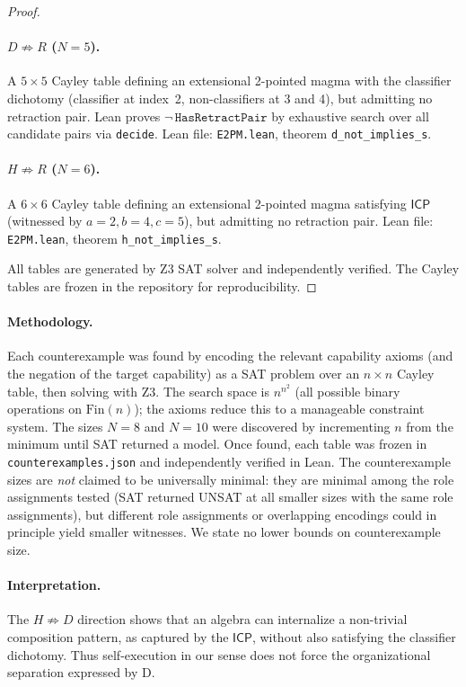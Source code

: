 \documentclass[sigconf,screen,review,anonymous]{acmart}
\newcommand{\ICP}{\textsf{ICP}}
\newcommand{\Fin}{\mathrm{Fin}}
\theoremstyle{remark}
\begin{document}
\begin{proof}
\paragraph{$D \not\Rightarrow R$ ($N\!=\!5$).}
A $5 \times 5$ Cayley table defining an extensional 2-pointed magma with the classifier dichotomy (classifier at index~2, non-classifiers at 3 and 4), but admitting no retraction pair. Lean proves $\neg\,\texttt{HasRetractPair}$ by exhaustive search over all candidate pairs via \texttt{decide}. Lean file: \texttt{E2PM.lean}, theorem \texttt{d\_not\_implies\_s}.

\paragraph{$H \not\Rightarrow R$ ($N\!=\!6$).}
A $6 \times 6$ Cayley table defining an extensional 2-pointed magma satisfying $\ICP$ (witnessed by $a\!=\!2, b\!=\!4, c\!=\!5$), but admitting no retraction pair. Lean file: \texttt{E2PM.lean}, theorem \texttt{h\_not\_implies\_s}.

All tables are generated by Z3 SAT solver and independently verified. The Cayley tables are frozen in the repository for reproducibility.
\end{proof}

\paragraph{Methodology.}
Each counterexample was found by encoding the relevant capability axioms (and the negation of the target capability) as a SAT problem over an $n \times n$ Cayley table, then solving with Z3. The search space is $n^{n^2}$ (all possible binary operations on $\Fin(n)$); the axioms reduce this to a manageable constraint system. The sizes $N\!=\!8$ and $N\!=\!10$ were discovered by incrementing $n$ from the minimum until SAT returned a model. Once found, each table was frozen in \texttt{counterexamples.json} and independently verified in Lean. The counterexample sizes are \emph{not} claimed to be universally minimal: they are minimal among the role assignments tested (SAT returned UNSAT at all smaller sizes with the same role assignments), but different role assignments or overlapping encodings could in principle yield smaller witnesses. We state no lower bounds on counterexample size.

\paragraph{Interpretation.}
The $H \not\Rightarrow D$ direction shows that an algebra can internalize a non-trivial composition pattern, as captured by the $\ICP$, without also satisfying the classifier dichotomy. Thus self-execution in our sense does not force the organizational separation expressed by D.
\end{document}
